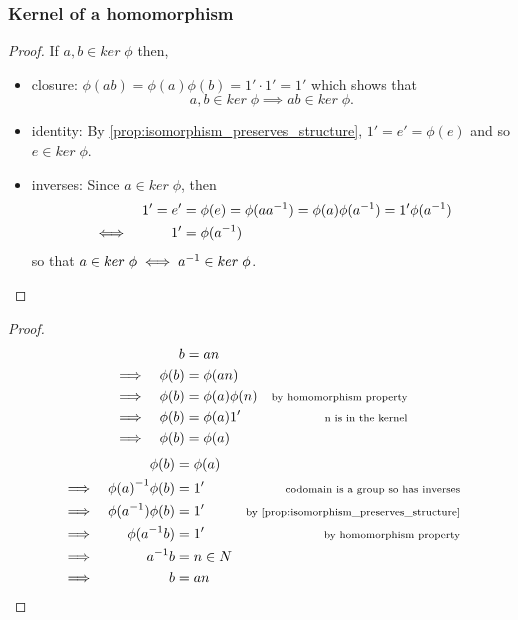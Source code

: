 \documentclass[MathsNotesBase.tex]{subfiles}
\begin{document}
{	\subsubsection{Kernel of a homomorphism}

	\begin{proof}
		If $a,b \in ker \; \phi$ then,
		\begin{itemize}
			\item{closure: $ \phi(ab) = \phi(a)\phi(b) = 1' \cdot 1' = 1' $ which shows that 
				\[ a,b \in ker \; \phi \implies ab \in ker \; \phi. \] }
			\item{identity: By \autoref{prop:isomorphism_preserves_structure}, $ 1' = e' = \phi(e) $ and so $e \in ker \; \phi $.}
			\item{inverses: Since $ a \in ker \; \phi $, then 
				\begin{align*}
				&&1' = e' &= \phi(e) = \phi(a{a}^{-1}) = \phi(a)\phi({a}^{-1}) = 1'\phi({a}^{-1}) \\
				&\iff &1' &= \phi({a}^{-1})
				\end{align*}
				so that $ a \in ker \; \phi \iff {a}^{-1} \in ker \; \phi $.}
		\end{itemize}
	\end{proof}

	\begin{proof}
		\begin{align*}
		&& b &= an  \\
		&\implies & \phi(b) &= \phi(an) \\
		&\implies & \phi(b) &= \phi(a)\phi(n) &\text{\scriptsize{by homomorphism property}} \\
		&\implies & \phi(b) &= \phi(a)1' &\text{\scriptsize{n is in the kernel}} \\
		&\implies & \phi(b) &= \phi(a) \\
		\end{align*}
		\begin{align*}
		&& \phi(b) &= \phi(a) \\
		&\implies & \inv{\phi(a)}\phi(b) &= 1'  &\sidecomment{codomain is a group so has inverses} \\
		&\implies & \phi(\inv{a})\phi(b) &= 1' &\sidecomment{by \autoref{prop:isomorphism_preserves_structure}} \\
		&\implies & \phi(\inv{a}b) &= 1' &\sidecomment{by homomorphism property} \\
		&\implies & \inv{a}b &= n \in N \\
		&\implies & b &= an \\
		\end{align*}
	\end{proof}
	
}
\end{document}
